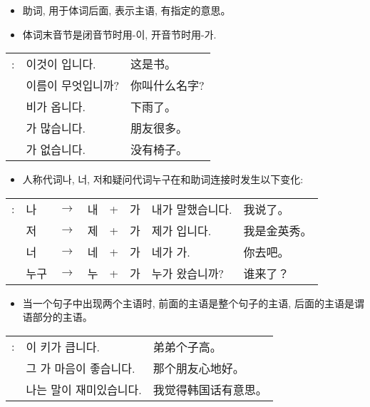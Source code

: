 \begin{grammar}
    \begin{grammarsect}[\kr -이/-가]
        \begin{itemize}
            \item 助词, 用于体词后面, 表示主语, 有指定的意思。
            \item 体词末音节是闭音节时用{\kr -이}, 开音节时用{\kr -가}.
        \end{itemize}
        \begin{tabular}{lll}
            \kr \ruby{例}{예}:& \kr 이것이 \ruby{冊}{책}입니다.&这是书。\\
            &\kr 이름이 무엇입니까?&你叫什么名字?\\
            &\kr 비가 옵니다.&下雨了。\\
            &\kr \ruby{親舊}{친구}가 많습니다.&朋友很多。\\
            &\kr \ruby{椅子}{의자}가 없습니다.&没有椅子。
        \end{tabular}
        \begin{itemize}
            \item 人称代词{\kr 나, 너, 저}和疑问代词{\kr 누구}在和助词连接时发生以下变化:
        \end{itemize}
        \begin{tabular}{llllllll}
            \kr \ruby{例}{예}:&\kr 나 &$\to$&\kr 내&+&\kr 가&\kr 내가 말했습니다.&我说了。\\
            &\kr 저&$\to$&\kr 제&+ &\kr 가 &\kr 제가 \ruby{金英秀}{김영수}입니다. &我是金英秀。\\
            &\kr 너& $\to$ &\kr 네 &+ &\kr 가 &\kr 네가 가. &你去吧。\\
            &\kr 누구 &$\to$&\kr 누& + &\kr 가 &\kr 누가 왔습니까? &谁来了？\\
        \end{tabular}
        \begin{itemize}
            \item 当一个句子中出现两个主语时, 前面的主语是整个句子的主语, 后面的主语是谓语部分的主语。
        \end{itemize}
        \begin{tabular}{lll}
            \kr \ruby{例}{예}: &\kr \ruby{同生}{동생}이 키가 큽니다.&弟弟个子高。\\
            &\kr 그 \ruby{親舊}{친구}가 마음이 좋습니다.&那个朋友心地好。\\
            &\kr 나는 \ruby{韓國}{한국}말이 재미있습니다.&我觉得韩国话有意思。\\

\end{tabular}
\end{grammarsect}
\end{grammar}
